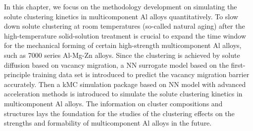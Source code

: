 In this chapter, we focus on the methodology development on simulating the solute clustering kinetics in multicomponent Al alloys quantitatively. To slow down solute clustering at room temperatures (so-called natural aging) after the high-temperature solid-solution treatment is crucial to expand the time window for the mechanical forming of certain high-strength multicomponent Al alloys, such as 7000 series Al-Mg-Zn alloys. Since the clustering is achieved by solute diffusion based on vacancy migration, a \acf{NN} surrogate model based on the first-principle training data set is introduced to predict the vacancy migration barrier accurately. Then a \acf{kMC} simulation package based on \ac{NN} model with advanced acceleration methods is introduced to simulate the solute clustering kinetics in multicomponent Al alloys. The information on cluster compositions and structures lays the foundation for the studies of the clustering effects on the strengths and formability of multicomponent Al alloys in the future.





